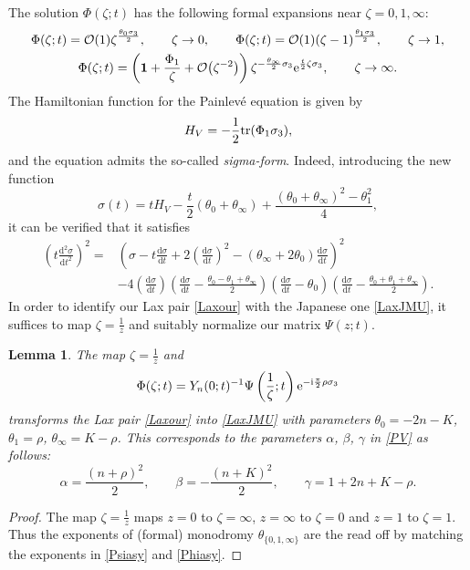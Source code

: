 \documentclass[10pt,a4paper]{amsart}
\numberwithin{equation}{section}
\newtheorem{Lemma}[Theorem]{Lemma}
\theoremstyle{definition}
\def\tr{{\rm tr}}
\def\le{\left}
\def\ri{\right}
\def \d{{\mathrm d}}
\def\nn{\nonumber}
\def\be{\begin{equation}}
\def\ee{\end{equation}}
\def \1{\mathbf 1}
\def\s{\sigma}
\begin{document}
 The solution $\Phi(\zeta;t)$ has the following formal expansions near $\zeta=0, 1, \infty$:
 \begin{gather}
 \Phi(\zeta;t) = \mathcal O(1) \zeta^\frac {\theta_0 \s_3}2, \qquad \zeta \to 0,\qquad
 \Phi(\zeta;t) = \mathcal O(1) (\zeta-1)^\frac {\theta_1 \s_3}2, \qquad \zeta \to 1,\nn\\
 \Phi(\zeta;t) =\le(\1 + \frac {\Phi_1}\zeta + \mathcal O\bigl(\zeta^{-2}\bigr)\ri) \zeta ^{-\frac {\theta_\infty}2 \s_3}{\rm e}^{\frac t 2 \zeta\s_3}, \qquad \zeta \to \infty.
 \label{Phiasy}
\end{gather}
 The Hamiltonian function for the Painlev\'e equation is given by
 \be
 \label{HamJMUPV}
 H_V = -\frac 1 2 \tr( \Phi_1\s_3),
 \ee
 and the equation admits the so-called {\it sigma-form}. Indeed, introducing the new function
 \[
 \s(t) = t H_V - \frac t 2 (\theta_0 + \theta_\infty) + \frac { (\theta_0 + \theta_\infty)^2 - \theta_1^2}4,
 \]
 it can be verified that it satisfies \cite[formula (C.45)]{JMU2}
 \begin{align*}%
 \le(t \frac {\d^2 \s}{\d t^2}\ri)^2 ={}& \le(
 \s - t\frac {\d \s}{\d t} + 2\le(\frac {\d \s}{\d t}\ri)^2 - (\theta_\infty + 2\theta_0) \frac {\d \s}{\d t}
 \ri)^2 \\
 &- 4 \le(\frac {\d \s}{\d t}\ri)
 \le(\frac {\d \s}{\d t} - \frac { \theta_0 -\theta_1 + \theta_\infty}2 \ri)
 \le( \frac {\d \s}{\d t} - \theta_0 \ri)
 \le(\frac {\d \s}{\d t} - \frac { \theta_0 + \theta_1 + \theta_\infty}2 \ri).
 \end{align*}
In order to identify our Lax pair \eqref{Laxour} with the Japanese one \eqref{LaxJMU}, it suffices to map $\zeta = \frac 1 z$ and suitably normalize our matrix $\Psi(z;t)$.
\begin{Lemma}
The map $\zeta = \frac 1 z$ and
\[
\Phi(\zeta;t) = Y_n(0;t)^{-1}\Psi\le(\frac 1 \zeta;t\ri){\rm e}^{-{\rm i}\frac{\pi}2 { {\rho}} \s_3}
\]
transforms the Lax pair \eqref{Laxour} into \eqref{LaxJMU} with parameters
$
\theta_0 = - 2n - { {K}}$, $
\theta_1 = { {\rho}}$, $
\theta_\infty= { {K}}-{ {\rho}} $.
This corresponds to the parameters $\alpha$, $\beta$, $\gamma$ in \eqref{PV} as follows:
\[
\alpha = \frac {(n+ { {\rho}})^2}2,\qquad
\beta = -\frac {(n + { {K}})^2} 2,\qquad
\gamma = 1+2n + { {K}} - { {\rho}}.
\]
\end{Lemma}
\begin{proof}
The map $\zeta=\frac 1 z$ maps $z=0$ to $\zeta=\infty$, $z=\infty$ to $\zeta=0$ and $z=1 $ to $\zeta=1$. Thus the exponents of (formal) monodromy $\theta_{\{0,1,\infty\}}$ are the read off by matching the exponents in \eqref{Psiasy} and \eqref{Phiasy}.
\end{proof}
\end{document}
